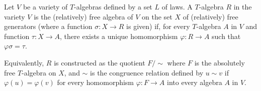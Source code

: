 Let $V$ be a variety of $T$-algebras defined by a set $L$ of laws. A $T$-algebra $R$ in the variety $V$ is the (relatively) free algebra of $V$ on the set $X$ of (relatively) free generators (where a function $\sigma: X \to R$ is given) if, for every $T$-algebra $A$ in $V$ and function $\tau: X \to A$, there exists a unique homomorphism $\varphi: R \to A$ such that $\varphi\sigma = \tau$.

Equivalently, $R$ is constructed as the quotient $F/{\sim}$ where $F$ is the absolutely free $T$-algebra on $X$, and $\sim$ is the congruence relation defined by $u \sim v$ if $\varphi(u) = \varphi(v)$ for every homomorphism $\varphi: F \to A$ into every algebra $A$ in $V$.
